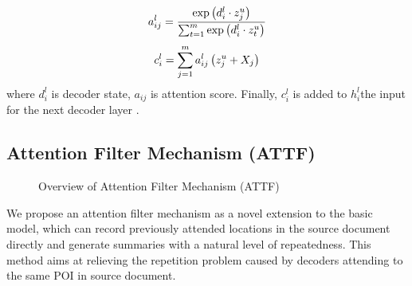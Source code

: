 \begin{equation}\label{eq:a}
\small
    a _ { i j } ^ { l } = \frac { \exp \left( d _ { i } ^ { l } \cdot z _ { j } ^ { u } \right) } { \sum _ { t = 1 } ^ { m } \exp \left( d _ { i } ^ { l } \cdot z _ { t } ^ { u } \right) }
\end{equation}
\begin{equation}\label{eq:c}
\small
    c _ { i } ^ { l } = \sum _ { j = 1 } ^ { m } a _ { i j } ^ { l } \left( z _ { j } ^ { u } + X_j \right)
\end{equation}
where $d_{i}^{l}$ is decoder state, \DIFaddbegin {}\DIFaddend $a_{ij}$ is attention score\DIFdelbegin {}\DIFdelend \DIFaddbegin {}\DIFaddend .
Finally, $c _ { i } ^ { l }$ is added to $h_{i}^{l}$\DIFdelbegin {}\DIFdelend \DIFaddbegin {}\DIFaddend the input for the next decoder layer \DIFaddbegin {}\DIFaddend .

\subsection{Attention Filter Mechanism (ATTF)}
\label{sec:attf}

\begin{figure}[th]
	\centering
	\caption{Overview of Attention Filter Mechanism (ATTF)}
	\label{fig:model_main}
\end{figure}


\label{sec:attnf}
We propose an attention filter mechanism as a novel extension 
to the basic model,
which can record previously attended locations 
in the source document directly and generate summaries 
with a natural level of repeatedness. 
This method aims at relieving the repetition problem caused by 
decoders attending to the same POI in source document.

